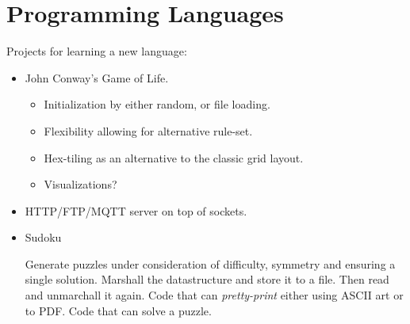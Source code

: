 \chapter{Programming Languages}

Projects for learning a new language:
\begin{itemize}
  \item John Conway's Game of Life.
    \begin{itemize}
      \item Initialization by either random, or file loading.
      \item Flexibility allowing for alternative rule-set.
      \item Hex-tiling as an alternative to the classic grid layout.
      \item Visualizations?
    \end{itemize}
  \item HTTP/FTP/MQTT server on top of sockets.
  \item Sudoku
    \begin{itemize}
       Generate puzzles under consideration of difficulty, symmetry and ensuring a single solution.
       Marshall the datastructure and store it to a file. Then read and unmarchall it again.
       Code that can \textsl{pretty-print} either using ASCII art or to PDF.
       Code that can solve a puzzle.
    \end{itemize}
\end{itemize}








